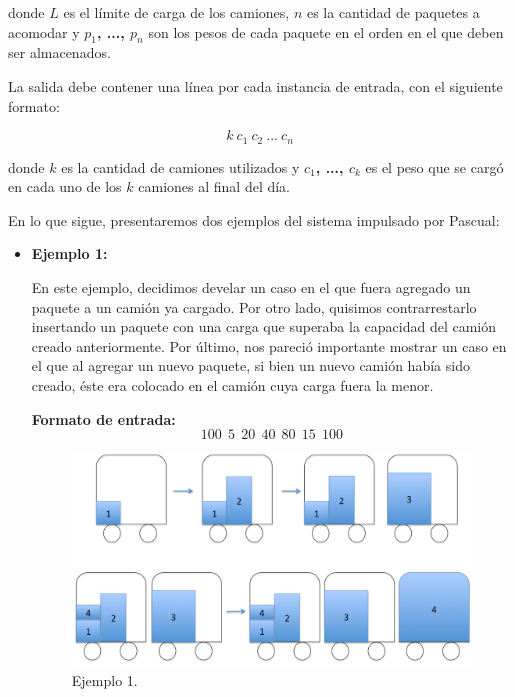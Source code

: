 donde \textbf{$L$} es el límite de carga de los camiones, \textbf{$n$} es la cantidad de paquetes a acomodar y \textbf{$p_{1}$, ..., $p_{n}$} son los pesos de cada paquete en el orden en el que deben ser almacenados.\newline

La salida debe contener una línea por cada instancia de entrada, con el siguiente formato:

$$k\ c_{1}\ c_{2}\ ...\ c_{n}$$


donde \textbf{$k$} es la cantidad de camiones utilizados y \textbf{$c_{1}$, ..., $c_{k}$} es el peso que se cargó en cada uno de los \textbf{$k$} camiones al final del día.\newline

En lo que sigue, presentaremos dos ejemplos del sistema impulsado por Pascual:
\begin{itemize}
\item {\large{\textbf{Ejemplo 1:}}}\newline

En este ejemplo, decidimos develar un caso en el que fuera agregado un paquete a un camión ya cargado. Por otro lado, quisimos contrarrestarlo insertando un paquete con una carga que superaba la capacidad del camión creado anteriormente. Por último, nos pareció importante mostrar un caso en el que al agregar un nuevo paquete, si bien un nuevo camión había sido creado, éste era colocado en el camión cuya carga fuera la menor.\newline

\textbf{Formato de entrada:}
$$100\ \ 5\ \ 20\ \ 40\ \ 80\ \ 15\ \ 100$$

\begin{figure}[H] %
\begin{center}
\includegraphics[width=320pt]{../imgs/ejemplo1.jpg}
\caption{Ejemplo 1.}
\end{center}
\end{figure}


\end{itemize}
